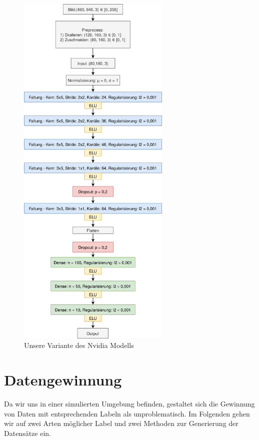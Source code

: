\begin{figure}[H]
	\centering
	\includegraphics[width=0.65\textwidth]{kapitel4/images/drawio.png}
	\caption{Unsere Variante des Nvidia Modells}
	\label{nvidia-model}
	\vspace{0.2cm}
\end{figure}


\section{Datengewinnung}

Da wir uns in einer simulierten Umgebung befinden, gestaltet sich die Gewinnung von Daten mit entsprechenden Labeln als unproblematisch.
Im Folgenden gehen wir auf zwei Arten möglicher Label und zwei Methoden zur Generierung der Datensätze ein.

